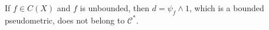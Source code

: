 If $f \in C(X)$ and $f$ is unbounded, then $d = \psi_f \wedge 1$, which is a bounded pseudometric, does not belong to $\mathcal{C}^*$.
